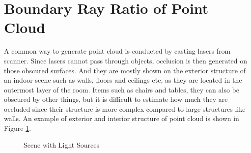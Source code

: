 \documentclass[11pt, a4paper,oneside,chapterprefix=false]{scrbook}
\begin{document}
\vspace{10pt}

\section{Boundary Ray Ratio of Point Cloud}

A common way to generate point cloud is conducted by casting lasers from scanner. Since lasers cannot pass through objects, occlusion is then generated on those obscured surfaces. And they are mostly shown on the exterior structure of an indoor scene such as walls, floors and ceilings etc, as they are located in the outermost layer of the room. Items such as chairs and tables, they can also be obscured by other things, but it is difficult to estimate how much they are occluded since their structure is more complex compared to large structures like walls. An example of exterior and interior structure of point cloud is shown in Figure \ref{fig:Exterior and interior structure of a point cloud}.

\begin{figure}[H]
    \centering
     \label{fig:exterior} 
     \label{fig:interior}
    \caption{Scene with Light Sources}
    \label{fig:Exterior and interior structure of a point cloud}
\end{figure}
\end{document}
